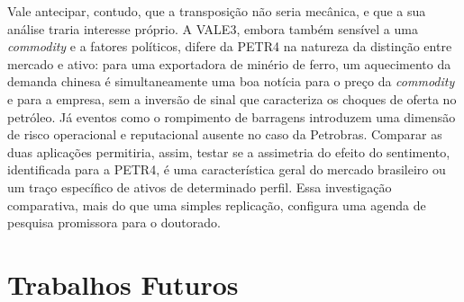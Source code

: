 Vale antecipar, contudo, que a transposição não seria mecânica, e que a sua análise traria interesse próprio. A VALE3, embora também sensível a uma \textit{commodity} e a fatores políticos, difere da PETR4 na natureza da distinção entre mercado e ativo: para uma exportadora de minério de ferro, um aquecimento da demanda chinesa é simultaneamente uma boa notícia para o preço da \textit{commodity} e para a empresa, sem a inversão de sinal que caracteriza os choques de oferta no petróleo. Já eventos como o rompimento de barragens introduzem uma dimensão de risco operacional e reputacional ausente no caso da Petrobras. Comparar as duas aplicações permitiria, assim, testar se a assimetria do efeito do sentimento, identificada para a PETR4, é uma característica geral do mercado brasileiro ou um traço específico de ativos de determinado perfil. Essa investigação comparativa, mais do que uma simples replicação, configura uma agenda de pesquisa promissora para o doutorado.

\section{Trabalhos Futuros}

